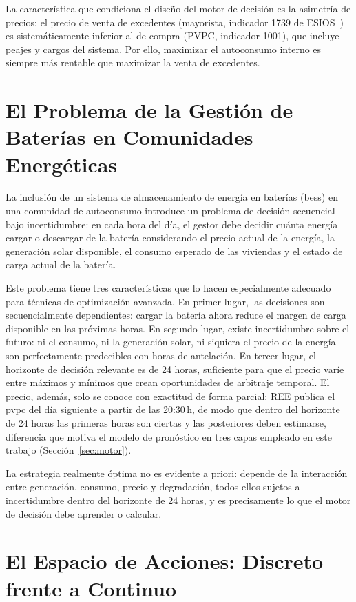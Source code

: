 \documentclass[12pt, a4paper, twoside]{report}
\begin{document}
La característica que condiciona el diseño del motor de decisión es la asimetría
de precios: el precio de venta de excedentes (mayorista, indicador 1739 de
ESIOS~\citep{ESIOS}) es sistemáticamente inferior al de compra (PVPC,
indicador 1001), que
incluye peajes y cargos del sistema. Por ello, maximizar el autoconsumo interno
es siempre más rentable que maximizar la venta de excedentes.

\section{El Problema de la Gestión de Baterías en Comunidades Energéticas}

La inclusión de un sistema de almacenamiento de energía en baterías
(\acrshort{bess}) en una comunidad de autoconsumo introduce un problema de
decisión secuencial bajo incertidumbre: en cada hora del día, el gestor debe
decidir cuánta energía cargar o descargar de la batería considerando el precio
actual de la energía, la generación solar disponible, el consumo esperado de
las viviendas y el estado de carga actual de la batería.

Este problema tiene tres características que lo hacen especialmente adecuado
para técnicas de optimización avanzada. En primer lugar, las decisiones son
secuencialmente dependientes: cargar la batería ahora reduce el margen de carga
disponible en las próximas horas. En segundo lugar, existe incertidumbre sobre
el futuro: ni el consumo, ni la generación solar, ni siquiera el precio de la
energía son perfectamente predecibles con horas de antelación. En tercer lugar,
el horizonte de decisión relevante es de 24 horas, suficiente para que el precio
varíe entre máximos y mínimos que crean oportunidades de arbitraje temporal. El
precio, además, solo se conoce con exactitud de forma parcial: REE publica el
\acrshort{pvpc} del día siguiente a partir de las 20:30\,h, de modo que dentro
del horizonte de 24 horas las primeras horas son ciertas y las posteriores deben
estimarse, diferencia que motiva el modelo de pronóstico en tres capas empleado
en este trabajo (Sección~\ref{sec:motor}).

La estrategia realmente óptima no es evidente a priori: depende de la
interacción entre generación, consumo, precio y degradación, todos ellos
sujetos a incertidumbre dentro del horizonte de 24 horas, y es precisamente lo
que el motor de decisión debe aprender o calcular.

\section{El Espacio de Acciones: Discreto frente a Continuo}
\end{document}

